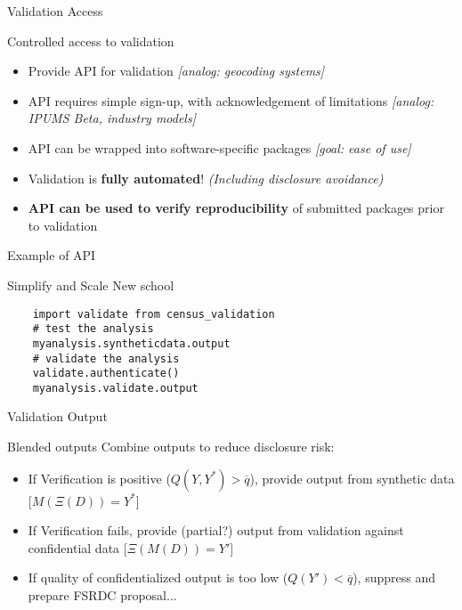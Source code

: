 \begin{frame}{Validation Access}
\begin{block}{Controlled access to validation}
\begin{itemize}
    \item Provide API for validation \textit{[analog: geocoding systems]}
    \item API requires simple sign-up, with acknowledgement of limitations \textit{[analog: IPUMS Beta, industry models]}
    \item API can be wrapped into software-specific packages \textit{[goal: ease of use]}
    \item Validation is \textbf{fully automated}! \textit{(Including disclosure avoidance)}
    \item \textbf{API can be used to verify reproducibility} of submitted packages prior to validation
\end{itemize}
\end{block}

\end{frame}


\begin{frame}[fragile]{Example of API}
\begin{block}{Simplify and Scale}
		New school
	\begin{verbatim}
	import validate from census_validation
	# test the analysis
	myanalysis.syntheticdata.output
	# validate the analysis
	validate.authenticate()
	myanalysis.validate.output
	\end{verbatim}
\end{block}
\end{frame}

\begin{frame}{Validation Output}
\begin{block}{Blended outputs}
Combine outputs to reduce disclosure risk:
\begin{itemize}
    \item If  Verification \citep{reiterVerificationServersEnabling2009,barrientos2018a} is positive ($Q(Y,Y^*)>\overline{q}$), provide output from synthetic data {\color{blue} [$M(\Xi(D))=Y^*$]}
    \item If Verification fails, provide (partial?) output from validation against confidential data {\color{blue} [$\Xi(M(D)) = Y'$]}
    \item If quality of confidentialized output is too low ($Q(Y')<\overline{q}$), suppress and prepare FSRDC proposal...
\end{itemize}
\end{block}
\end{frame}


